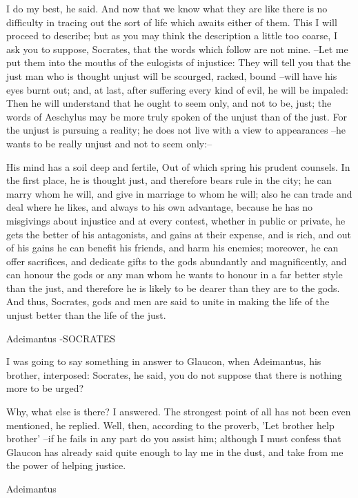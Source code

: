 I do my best, he said. And now that we know what they are like there is no difficulty in tracing out the sort of life which awaits either of them. This I will proceed to describe; but as you may think the description a little too coarse, I ask you to suppose, Socrates, that the words which follow are not mine. --Let me put them into the mouths of the eulogists of injustice: They will tell you that the just man who is thought unjust will be scourged, racked, bound --will have his eyes burnt out; and, at last, after suffering every kind of evil, he will be impaled: Then he will understand that he ought to seem only, and not to be, just; the words of Aeschylus may be more truly spoken of the unjust than of the just. For the unjust is pursuing a reality; he does not live with a view to appearances --he wants to be really unjust and not to seem only:--

His mind has a soil deep and fertile,
Out of which spring his prudent counsels. In the first place, he is thought just, and therefore bears rule in the city; he can marry whom he will, and give in marriage to whom he will; also he can trade and deal where he likes, and always to his own advantage, because he has no misgivings about injustice and at every contest, whether in public or private, he gets the better of his antagonists, and gains at their expense, and is rich, and out of his gains he can benefit his friends, and harm his enemies; moreover, he can offer sacrifices, and dedicate gifts to the gods abundantly and magnificently, and can honour the gods or any man whom he wants to honour in a far better style than the just, and therefore he is likely to be dearer than they are to the gods. And thus, Socrates, gods and men are said to unite in making the life of the unjust better than the life of the just.

Adeimantus -SOCRATES

I was going to say something in answer to Glaucon, when Adeimantus, his brother, interposed: Socrates, he said, you do not suppose that there is nothing more to be urged?

Why, what else is there? I answered.
The strongest point of all has not been even mentioned, he replied.
Well, then, according to the proverb, 'Let brother help brother' --if he fails in any part do you assist him; although I must confess that Glaucon has already said quite enough to lay me in the dust, and take from me the power of helping justice.

Adeimantus

